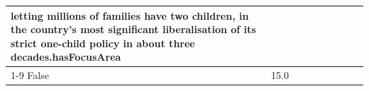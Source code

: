 \begin{table}[H]
\begin{tabular}{lllrlllll}
letting millions of families have two children, in the country's most significant liberalisation of its strict one-child policy in about three decades.hasFocusArea \\
\cline{1-9}
False & 15.0%
\end{tabular}
\end{table}

